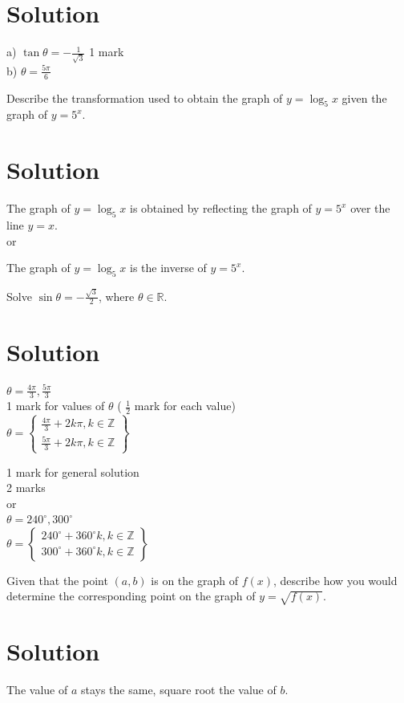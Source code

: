 \documentclass[10pt]{article}
\begin{document}
\section*{Solution}
a) $\tan \theta=-\frac{1}{\sqrt{3}}$ 1 mark\\
b) $\theta=\frac{5 \pi}{6}$

Describe the transformation used to obtain the graph of $y=\log _{5} x$ given the graph of $y=5^{x}$.

\section*{Solution}
The graph of $y=\log _{5} x$ is obtained by reflecting the graph of $y=5^{x}$ over the line $y=x$.\\
or

The graph of $y=\log _{5} x$ is the inverse of $y=5^{x}$.

Solve $\sin \theta=-\frac{\sqrt{3}}{2}$, where $\theta \in \mathbb{R}$.

\section*{Solution}
$\theta=\frac{4 \pi}{3}, \frac{5 \pi}{3}$\\
1 mark for values of $\theta$ ( $\frac{1}{2}$ mark for each value)\\
$\theta=\left\{\begin{array}{l}\frac{4 \pi}{3}+2 k \pi, k \in \mathbb{Z} \\ \frac{5 \pi}{3}+2 k \pi, k \in \mathbb{Z}\end{array}\right\}$

1 mark for general solution\\
2 marks\\
or\\
$\theta=240^{\circ}, 300^{\circ}$\\
$\theta=\left\{\begin{array}{l}240^{\circ}+360^{\circ} k, k \in \mathbb{Z} \\ 300^{\circ}+360^{\circ} k, k \in \mathbb{Z}\end{array}\right\}$

Given that the point $(a, b)$ is on the graph of $f(x)$, describe how you would determine the corresponding point on the graph of $y=\sqrt{f(x)}$.

\section*{Solution}
The value of $a$ stays the same, square root the value of $b$.
\end{document}
